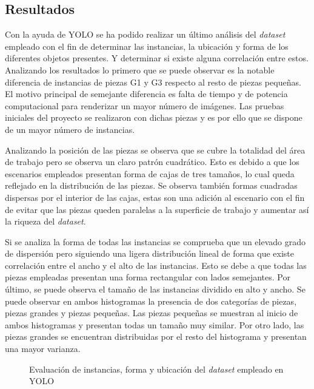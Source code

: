\subsection{Resultados}
\label{chap:Sistema de visión artificial sec:YOLO Resultados}
Con la ayuda de YOLO se ha podido realizar un último análisis del \textit{dataset} empleado con el fin de determinar las instancias, la ubicación y forma de los diferentes objetos presentes. Y determinar si existe alguna correlación entre estos. Analizando los resultados lo primero que se puede observar es la notable diferencia de instancias de piezas G1 y G3 respecto al resto de piezas pequeñas. El motivo principal de semejante diferencia es falta de tiempo y de potencia computacional para renderizar un mayor número de imágenes. Las pruebas iniciales del proyecto se realizaron con dichas piezas y es por ello que se dispone de un mayor número de instancias.

Analizando la posición de las piezas se observa que se cubre la totalidad del área de trabajo pero se observa un claro patrón cuadrático. Esto es debido a que los escenarios empleados presentan forma de cajas de tres tamaños, lo cual queda reflejado en la distribución de las piezas. Se observa también formas cuadradas dispersas por el interior de las cajas, estas son una adición al escenario con el fin de evitar que las piezas queden paralelas a la superficie de trabajo y aumentar así la riqueza del \textit{dataset}.

Si se analiza la forma de todas las instancias se comprueba que un elevado grado de dispersión pero siguiendo una ligera distribución lineal de forma que existe correlación entre el ancho y el alto de las instancias. Esto se debe a que todas las piezas empleadas presentan una forma rectangular con lados semejantes. Por último, se puede observa el tamaño de las instancias dividido en alto y ancho. Se puede observar en ambos histogramas la presencia de dos categorías de piezas, piezas grandes y piezas pequeñas. Las piezas pequeñas se muestran al inicio de ambos histogramas y presentan todas un tamaño muy similar. Por otro lado, las piezas grandes se encuentran distribuidas por el resto del histograma y presentan una mayor varianza.

\begin{figure}[ht]
  \hfill	
\caption{Evaluación de instancias, forma y ubicación del \textit{dataset} empleado en YOLO}
\label{chap:Sistema de visión artificial fig:YOLO labels}
\end{figure}

